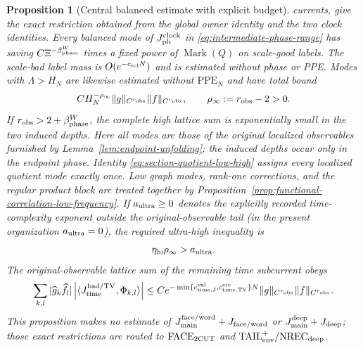 \documentclass[11pt]{article}
\newtheorem{proposition}[theorem]{Proposition}
\begin{document}
\begin{proposition}[Central balanced estimate with explicit budget]
currents, give the exact restriction obtained from the global owner identity
and the two clock identities.  Every
balanced mode of $J_{\rm ph}^{\rm clock}$ in
\eqref{eq:intermediate-phase-range} has saving
\(C\Xi^{-\beta_{\rm phase}^{W}}\) times a fixed power of
\(\operatorname{Mark}(Q)\) on scale-good labels.  The scale-bad label mass is
$O(e^{-c_{\rm scl}N})$ and is estimated without phase or PPE.  Modes with
$\Lambda>H_N$ are likewise estimated without
$\mathrm{PPE}_{N}$ and have total bound
\begin{equation}
\label{eq:ultra-high-observable-tail}
 C H_N^{-\rho_\infty}\|g\|_{C^{r_{\rm obs}}}
 \|f\|_{C^{r_{\rm obs}}},\qquad
 \rho_\infty:=r_{\rm obs}-2>0.
\end{equation}
If $r_{\rm obs}>2+\beta_{\rm phase}^{W}$, the complete high lattice sum is
exponentially small in the two induced depths.  Here all modes are those of the original
localized observables furnished by Lemma~\ref{lem:endpoint-unfolding}; the
induced depths occur only in the endpoint phase.  Identity
\eqref{eq:section-quotient-low-high} assigns every localized quotient mode
exactly once.  Low graph modes, rank-one corrections, and
the regular product block are treated together by
Proposition~\ref{prop:functional-correlation-low-frequency}.  If
$a_{\rm ultra}\ge0$ denotes the explicitly recorded time-complexity exponent
outside the original-observable tail (in the present organization
$a_{\rm ultra}=0$), the required ultra-high inequality is
\begin{equation}
\label{eq:ultra-high-exponent-window}
 \eta_{\rm hi}\rho_\infty>a_{\rm ultra}.
\end{equation}
The original-observable lattice sum of the remaining time subcurrent obeys
\begin{equation}
\label{eq:time-clock-complete-lattice-bound}
 \sum_{k,l}|\widehat g_k\widehat f_l|
 \left|\langle J_{\rm time}^{\rm bad/TV},\Phi_{k,l}\rangle\right|
 \le C e^{-\min\{c_{\rm time,J}^{\rm val},
                     c_{\rm time,TV}^{\rm src}\}N}
       \|g\|_{C^{r_{\rm obs}}}\|f\|_{C^{r_{\rm obs}}}.
\end{equation}
This proposition makes no estimate of
$J_{\rm main}^{\rm face/word}+J_{\rm face/word}$ or
$J_{\rm main}^{\rm deep}+J_{\rm deep}$; those exact restrictions are routed
to $\mathrm{FACE}_{\rm 2CUT}$ and
$\mathrm{TAIL}_{\rm env}^{+}/\mathrm{NREC}_{\rm deep}$.
\end{proposition}
\end{document}
